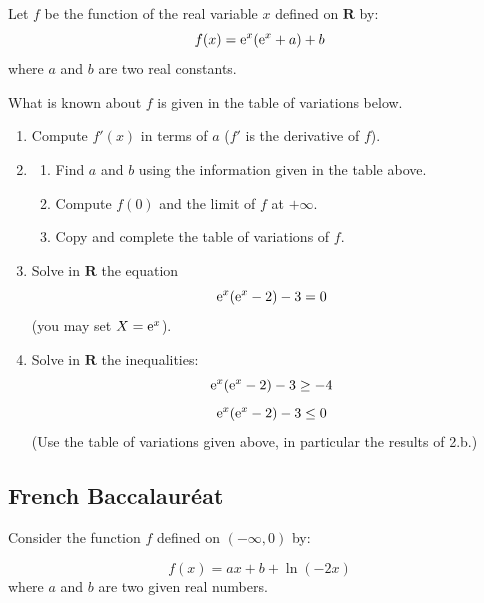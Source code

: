 \begin{tkzexample}
  Let $f$ be the function of the real variable $x$ defined on $\mathbf{R}$ by:
  \[
      f(x)=\mathrm{e}^x(\mathrm{e}^x+a)+b
  \]
  where $a$ and $b$ are two real constants.

  What is known about $f$ is given in the table of variations below.

  \medskip
  \begin{center}
  \end{center}

  \medskip
  \begin{enumerate}
      \item Compute $f'(x)$ in terms of $a$ ($f'$ is the derivative of $f$).
      \item \begin{enumerate}
             \item Find $a$ and $b$ using the information given in the
              table above.
             \item Compute $f(0)$ and the limit of $f$ at $+\infty$.
             \item Copy and complete the table of variations of $f$.
             \end{enumerate}
      \item Solve in $\mathbf{R}$ the equation
      \[
          \mathrm{e}^x(\mathrm{e}^x-2)-3=0
      \]
      (you may set $X=\mathrm{e}^x$).
      \item Solve in $\mathbf{R}$ the inequalities:
      \[
          \mathrm{e}^x(\mathrm{e}^x-2)-3\geq -4
      \]
      \[
          \mathrm{e}^x(\mathrm{e}^x-2)-3 \leq 0
      \]
       (Use the table of variations given above, in particular the
        results of 2.b.)
  \end{enumerate}
\end{tkzexample}


\subsection{French Baccalauréat}
	Consider the function $f$ defined on $(-\infty, 0)$ by:

	\[
	  f(x)=ax+b+\ln(-2x)
	\]
	where $a$ and $b$ are two given real numbers.

